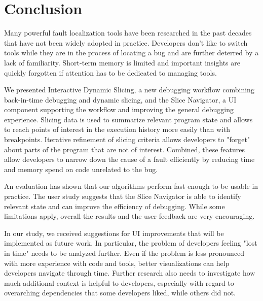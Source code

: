 \documentclass[
			english,
			]{elsarticle}
\begin{document}
\section{Conclusion}
\label{sec:conclusion}

Many powerful fault localization tools have been researched in the past decades that have not been widely adopted in practice.
Developers don't like to switch tools while they are in the process of locating a bug and are further deterred by a lack of familiarity.
Short-term memory is limited and important insights are quickly forgotten if attention has to be dedicated to managing tools.

We presented Interactive Dynamic Slicing, a new debugging workflow combining back-in-time debugging and dynamic slicing, and the Slice Navigator, a UI component supporting the workflow and improving the general debugging experience.
Slicing data is used to summarize relevant program state and allows to reach points of interest in the execution history more easily than with breakpoints.
Iterative refinement of slicing criteria allows developers to "forget" about parts of the program that are not of interest.
Combined, these features allow developers to narrow down the cause of a fault efficiently by reducing time and memory spend on code unrelated to the bug.

An evaluation has shown that our algorithms perform fast enough to be usable in practice.
The user study suggests that the Slice Navigator is able to identify relevant state and can improve the efficiency of debugging.
While some limitations apply, overall the results and the user feedback are very encouraging.

In our study, we received suggestions for UI improvements that will be implemented as future work.
In particular, the problem of developers feeling "lost in time" needs to be analyzed further.
Even if the problem is less pronounced with more experience with code and tools, better visualizations can help developers navigate through time.
Further research also needs to investigate how much additional context is helpful to developers, especially with regard to overarching dependencies that some developers liked, while others did not.
\end{document}
